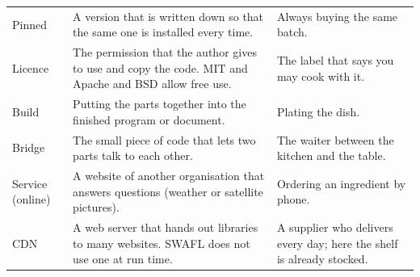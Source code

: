 {\begin{longtable}{@{}>{\raggedright\arraybackslash}p{2.9cm}>{\raggedright\arraybackslash}p{4.9cm}>{\raggedright\arraybackslash}p{5.2cm}@{}}
Pinned & A version that is written down so that the same one is installed every time. & Always buying the same batch.\\
Licence & The permission that the author gives to use and copy the code. MIT and Apache and BSD allow free use. & The label that says you may cook with it.\\
Build & Putting the parts together into the finished program or document. & Plating the dish.\\
Bridge & The small piece of code that lets two parts talk to each other. & The waiter between the kitchen and the table.\\
Service (online) & A website of another organisation that answers questions (weather or satellite pictures). & Ordering an ingredient by phone.\\
CDN & A web server that hands out libraries to many websites. SWAFL does not use one at run time. & A supplier who delivers every day; here the shelf is already stocked.\\
\bottomrule\end{longtable}}

